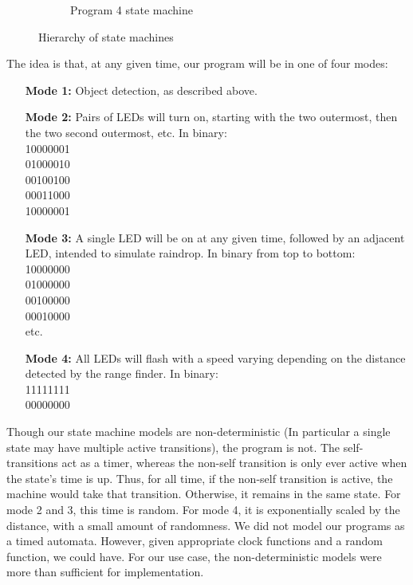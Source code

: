 \documentclass[10pt,titlepage]{article}
\begin{document}
\begin{figure}[p]
\begin{subfigure}[b]{0.48\textwidth}
      \caption{Program 4 state machine}
      \end{subfigure}
      \caption{Hierarchy of state machines}
  \end{figure} 

  The idea is that, at any given time, our program will be in one of four modes:
  \begin{enumerate}
      \item[\textbf{Mode 1: }] Object detection, as described above.
      \item[\textbf{Mode 2: }] Pairs of LEDs will turn on, starting with the two outermost, then the two second outermost, etc. In binary:\\
          10000001 \\
          01000010 \\
          00100100 \\
          00011000 \\
          10000001 
      \item[\textbf{Mode 3: }] A single LED will be on at any given time, followed by an adjacent LED, intended to simulate raindrop. In binary from top to bottom:\\
          10000000 \\
          01000000 \\
          00100000 \\
          00010000 \\
          etc.
      \item[\textbf{Mode 4: }] All LEDs will flash with a speed varying depending on the distance detected by the range finder. In binary:\\
          11111111 \\
          00000000 
  \end{enumerate}

  Though our state machine models are non-deterministic (In particular a single state may have multiple active transitions), the program is not. The self-transitions act as a timer, whereas the non-self transition is only ever active when the state's time is up. Thus, for all time, if the non-self transition is active, the machine would take that transition. Otherwise, it remains in the same state. For mode 2 and 3, this time is random. For mode 4, it is exponentially scaled by the distance, with a small amount of randomness. We did not model our programs as a timed automata. However, given appropriate clock functions and a random function, we could have. For our use case, the non-deterministic models were more than sufficient for implementation.\\
\end{document}
